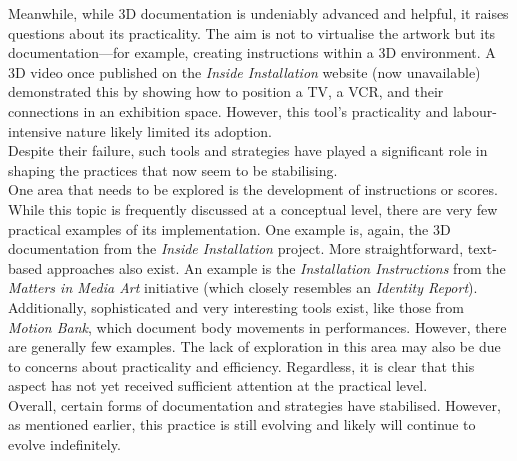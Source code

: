 Meanwhile, while 3D documentation is undeniably advanced and helpful, it raises questions about its practicality. The aim is not to virtualise the artwork but its documentation—for example, creating instructions within a 3D environment. A 3D video once published on the \textit{Inside Installation} website (now unavailable) demonstrated this by showing how to position a TV, a VCR, and their connections in an exhibition space. However, this tool's practicality and labour-intensive nature likely limited its adoption. \\
Despite their failure, such tools and strategies have played a significant role in shaping the practices that now seem to be stabilising.\\
One area that needs to be explored is the development of instructions or scores. While this topic is frequently discussed at a conceptual level, there are very few practical examples of its implementation. One example is, again, the 3D documentation from the \textit{Inside Installation} project. More straightforward, text-based approaches also exist. An example is the \textit{Installation Instructions} from the \textit{Matters in Media Art} initiative (which closely resembles an \textit{Identity Report}). Additionally, sophisticated and very interesting tools exist, like those from \textit{Motion Bank}, which document body movements in performances. However, there are generally few examples. The lack of exploration in this area may also be due to concerns about practicality and efficiency. Regardless, it is clear that this aspect has not yet received sufficient attention at the practical level.\\
Overall, certain forms of documentation and strategies have stabilised. However, as mentioned earlier, this practice is still evolving and likely will continue to evolve indefinitely.









  





